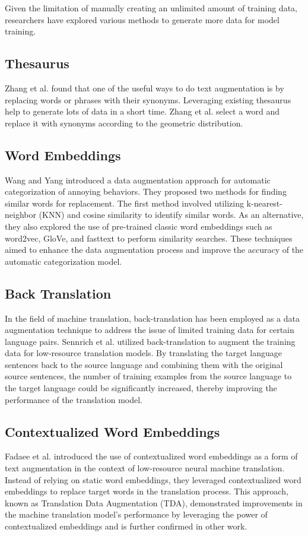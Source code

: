\documentclass[11pt]{article}
\begin{document}
Given the limitation of manually creating an unlimited amount of training data, researchers have explored various methods to generate more data for model training.\\

\subsection{Thesaurus}
Zhang et al. found that one of the useful ways to do text augmentation is by replacing words or phrases with their synonyms.\cite{NIPS2015_250cf8b5} Leveraging existing thesaurus help to generate lots of data in a short time. Zhang et al. select a word and replace it with synonyms according to the geometric distribution.\\

\subsection{Word Embeddings}
Wang and Yang introduced a data augmentation approach for automatic categorization of annoying behaviors.\cite{wang2015s} They proposed two methods for finding similar words for replacement. The first method involved utilizing k-nearest-neighbor (KNN) and cosine similarity to identify similar words. As an alternative, they also explored the use of pre-trained classic word embeddings such as word2vec, GloVe, and fasttext to perform similarity searches. These techniques aimed to enhance the data augmentation process and improve the accuracy of the automatic categorization model.\\

\subsection{Back Translation}
In the field of machine translation, back-translation has been employed as a data augmentation technique to address the issue of limited training data for certain language pairs. Sennrich et al. utilized back-translation to augment the training data for low-resource translation models.\cite{sennrich2015improving} By translating the target language sentences back to the source language and combining them with the original source sentences, the number of training examples from the source language to the target language could be significantly increased, thereby improving the performance of the translation model.

\subsection{Contextualized Word Embeddings}
Fadaee et al. introduced the use of contextualized word embeddings as a form of text augmentation in the context of low-resource neural machine translation.\cite{fadaee2017data} Instead of relying on static word embeddings, they leveraged contextualized word embeddings to replace target words in the translation process. This approach, known as Translation Data Augmentation (TDA), demonstrated improvements in the machine translation model's performance by leveraging the power of contextualized embeddings and is further confirmed in other work.\cite{kobayashi2018contextual}
\end{document}
